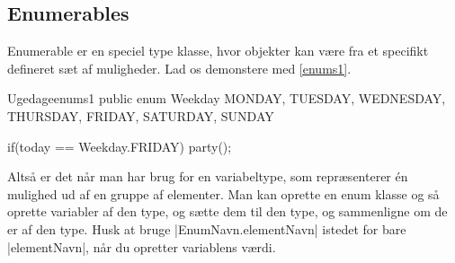 
\subsection{Enumerables}

Enumerable er en speciel type klasse, hvor objekter kan være fra et
specifikt defineret sæt af muligheder. Lad os demonstere med
\autoref{enums1}.

\begin{JavaCode}{Ugedage}{enums1}
	public enum Weekday{
		MONDAY,
		TUESDAY,
		WEDNESDAY,
		THURSDAY,
		FRIDAY,
		SATURDAY,
		SUNDAY
	}

	if(today == Weekday.FRIDAY){
		party();
	}
\end{JavaCode}

Altså er det når man har brug for en variabeltype, som repræsenterer
én mulighed ud af en gruppe af elementer. Man kan oprette en enum
klasse og så oprette variabler af den type, og sætte dem til den type,
og sammenligne om de er af den type. Husk at bruge
\JavaInline|EnumNavn.elementNavn| istedet for bare
\JavaInline|elementNavn|, når du opretter variablens værdi.



